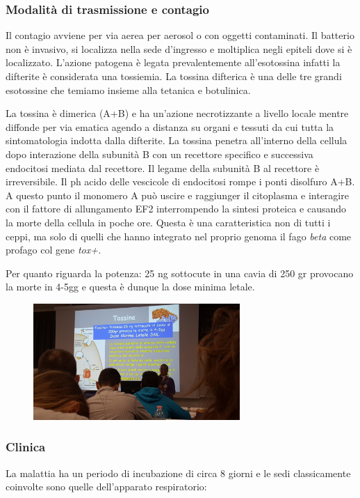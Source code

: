 \subsubsection{Modalità di trasmissione e contagio}

  Il contagio avviene per via aerea per aerosol o con oggetti
  contaminati. Il batterio non è invasivo, si localizza nella sede
  d'ingresso e moltiplica negli epiteli dove si è localizzato. L'azione
  patogena è legata prevalentemente all'esotossina infatti la difterite
  è considerata una tossiemia. La tossina difterica è una delle tre
  grandi esotossine che temiamo insieme alla tetanica e botulinica.

  La tossina è dimerica (A+B) e ha un'azione necrotizzante a livello
  locale mentre diffonde per via ematica agendo a distanza su organi e
  tessuti da cui tutta la sintomatologia indotta dalla difterite. La
  tossina penetra all'interno della cellula dopo interazione della
  subunità B con un recettore specifico e successiva endocitosi mediata
  dal recettore. Il legame della subunità B al recettore è
  irreversibile. Il ph acido delle vescicole di endocitosi rompe i ponti
  disolfuro A+B. A questo punto il monomero A può uscire e raggiunger il
  citoplasma e interagire con il fattore di allungamento EF2
  interrompendo la sintesi proteica e causando la morte della cellula in
  poche ore. Questa è una caratteristica non di tutti i ceppi, ma solo
  di quelli che hanno integrato nel proprio genoma il fago \emph{beta}
  come profago col gene \emph{tox+.}

  Per quanto riguarda la potenza: 25 ng sottocute in una cavia di 250 gr
  provocano la morte in 4-5gg e questa è dunque la dose minima letale.

  \begin{figure}[!ht]
\centering
\includegraphics[width=0.7\textwidth]{06/image4.jpeg}
\end{figure}

\subsubsection{Clinica}
  La malattia ha un periodo di incubazione di circa 8 giorni e le sedi
  classicamente coinvolte sono quelle dell'apparato respiratorio:

